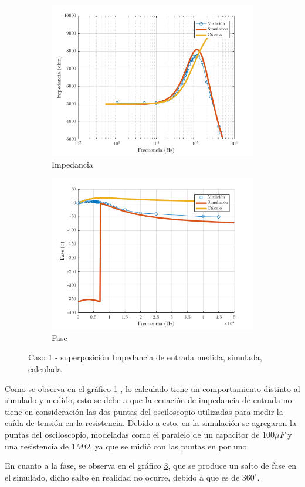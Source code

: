\documentclass[../../main.tex]{subfiles}
\begin{document}
\begin{figure}[H]
\centering
\begin{subfigure}[http]{0.49\textwidth}
\includegraphics[width=\textwidth]{imagenes/z_inv_r_c1.png}
\caption{Impedancia}\label{fig=zInvZc1}
\end{subfigure}
\begin{subfigure}[http]{0.49\textwidth}
\includegraphics[width=\textwidth]{imagenes/z_inv_f_c1.png}
\caption{Fase} \label{fig=zInvFc1}
\end{subfigure}
\caption{Caso 1 - superposición Impedancia de entrada  medida, simulada, calculada}
\end{figure}

Como se observa en el gr\'afico \ref{fig=zInvZc1} , lo calculado tiene un comportamiento distinto al simulado y medido, esto se debe a que  la ecuación de  impedancia de entrada no tiene en consideración las dos puntas del osciloscopio utilizadas para medir la caída de tensión en la resistencia. Debido a esto, en la simulación se agregaron la puntas del osciloscopio, modeladas como el paralelo de un capacitor de $100\mu F$ y una resistencia de $1M \Omega $, ya que se midió con las puntas en por uno.\par
En cuanto a la fase, se observa en el gr\'afico \ref{fig=zInvFc1}, que se produce un salto de fase en el simulado, dicho salto en realidad no ocurre, debido a que es de $360^{\circ}$.
\end{document}
